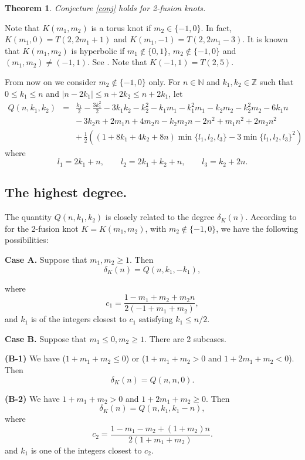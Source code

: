 \documentclass[11pt]{amsart}
\newtheorem{theorem}{Theorem}[section]
\theoremstyle{definition}
\def\BN{\mathbb N}
\def\BZ{\mathbb Z}
\begin{document}
\begin{theorem}
\label{thm:slope-cable} Conjecture  \ref{conj}  holds  for 2-fusion knots. 
\end{theorem}

Note that $K(m_1, m_2)$ is a torus knot if $m_2 \in \{-1,0\}$. In fact, $K(m_1, 0) = T(2, 2m_1 + 1)$ and $K(m_1, -1) = T(2, 2m_1 -3)$. It is known that $K(m_1, m_2)$ is hyperbolic if $m_1 \notin \{0, 1\}$, $m_2 \notin \{-1,0\}$ and $(m_1, m_2) \not= (-1,1)$. See \cite{GV}. Note that $K(-1,1) = T(2,5)$.

From now on we consider $m_2 \notin \{-1,0\}$ only.  For $n \in \BN$ and $k_1, k_2 \in \BZ$ such that $0 \le k_1 \le n$ and $|n-2k_1| \le n+2k_2 \le n+2k_1$, let
\begin{eqnarray*}
Q(n,k_1,k_2)&=& \frac{k_1}{2} - \frac{3 k_1^2}{2} - 3 k_1 k_2 - k_2^2 - k_1 m_1 - k_1^2 m_1 - k_2 m_2 - k_2^2 m_2 - 6 k_1 n \\ 
& & - \, 3 k_2 n + 2 m_1 n + 4 m_2 n - k_2 m_2 n - 2 n^2 + m_1 n^2 + 2 m_2 n^2 \\ 
& & + \, \frac{1}{2} \left( (1 + 8 k_1 + 4 k_2 + 8 n) \min\{l_1,l_2,l_3\} - 3 \min\{l_1,l_2,l_3\}^2\right)
\end{eqnarray*}
where
$$
l_1=2 k_1 + n, \qquad l_2=2 k_1 + k_2 + n, \qquad l_3=k_2 + 2 n.
$$
\medskip

\subsection{ The highest degree.} The quantity  $Q(n,k_1,k_2)$ is closely related
to the degree $\delta_K(n)$. According to \cite{GV}  for the 2-fusion knot $K=K(m_1,m_2)$, with $m_2 \notin \{-1, 0\}$, we have the following possibilities:
\vskip 0.04in


\textbf{Case A.} Suppose that $m_1, m_2 \ge 1$. Then
$$\delta_K(n) = Q(n,k_1,-k_1),$$

\noindent where $$c_1=\frac{1 - m_1 + m_2 + m_2 n}{2 (-1 + m_1 + m_2)},$$ 
and  $k_1$ is of the integers closest to $c_1$ satisfying $k_1 \le n/2$. 

\vskip 0.04in

\textbf{Case B.} Suppose that $m_1 \le 0, m_2 \ge 1$. There are 2 subcases.

\textbf{(B-1)} We have ($1 + m_1 + m_2 \le 0$) or ($1 + m_1 + m_2 > 0$ and $1 + 2m_1 + m_2 < 0$). Then
$$\delta_K(n) = Q(n,n,0).$$

\textbf{(B-2)}  We have $1 + m_1 + m_2 > 0$ and $1 + 2m_1 + m_2 \ge 0$. 
 Then
$$\delta_K(n) = Q(n,k_1,k_1-n),$$
\noindent where  $$c_2=\frac{1 - m_1 - m_2 + (1 + m_2) n}{2 (1 + m_1 + m_2)}.$$
and $k_1$ is one of the integers closest to $c_2$.
\end{document}

